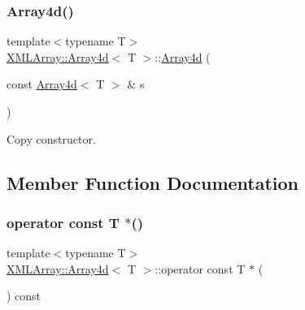 \mbox{\label{classXMLArray_1_1Array4d_aa288af6ef6ecbd04554a984ce1514c01}} 
\subsubsection{\texorpdfstring{Array4d()}{Array4d()}\hspace{0.1cm}{\footnotesize\ttfamily [6/6]}}
{\footnotesize\ttfamily template$<$typename T$>$ \\
\mbox{\hyperlink{classXMLArray_1_1Array4d}{X\+M\+L\+Array\+::\+Array4d}}$<$ T $>$\+::\mbox{\hyperlink{classXMLArray_1_1Array4d}{Array4d}} (\begin{DoxyParamCaption}\item[{const \mbox{\hyperlink{classXMLArray_1_1Array4d}{Array4d}}$<$ T $>$ \&}]{s }\end{DoxyParamCaption})\hspace{0.3cm}{\ttfamily [inline]}}



Copy constructor. 



\subsection{Member Function Documentation}
\mbox{\label{classXMLArray_1_1Array4d_abe07755f692bf1df5acf5b8b9cd266cb}} 
\subsubsection{\texorpdfstring{operator const T $\ast$()}{operator const T *()}\hspace{0.1cm}{\footnotesize\ttfamily [1/2]}}
{\footnotesize\ttfamily template$<$typename T$>$ \\
\mbox{\hyperlink{classXMLArray_1_1Array4d}{X\+M\+L\+Array\+::\+Array4d}}$<$ T $>$\+::operator const T $\ast$ (\begin{DoxyParamCaption}{ }\end{DoxyParamCaption}) const\hspace{0.3cm}{\ttfamily [inline]}}



